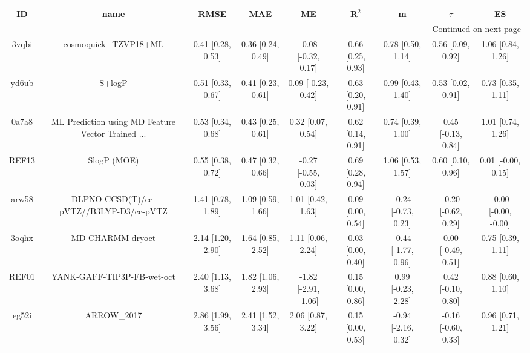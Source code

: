 \documentclass{article}
\begin{document}
\begin{center}
\scriptsize
\begin{longtable}{|ccccccccc|}
\toprule
    ID &                                               name &               RMSE &                MAE &                    ME &              R$^2$ &                    m &               $\tau$ &                    ES \\
\midrule
\endhead
\midrule
\multicolumn{9}{r}{{Continued on next page}} \\
\midrule
\endfoot

\bottomrule
\endlastfoot
 3vqbi &                              cosmoquick\_TZVP18+ML &  0.41 [0.28, 0.53] &  0.36 [0.24, 0.49] &   -0.08 [-0.32, 0.17] &  0.66 [0.25, 0.93] &    0.78 [0.50, 1.14] &    0.56 [0.09, 0.92] &     1.06 [0.84, 1.26] \\
 yd6ub &                                             S+logP &  0.51 [0.33, 0.67] &  0.41 [0.23, 0.61] &    0.09 [-0.23, 0.42] &  0.63 [0.20, 0.91] &    0.99 [0.43, 1.40] &    0.53 [0.02, 0.91] &     0.73 [0.35, 1.11] \\
 0a7a8 &  ML Prediction using MD Feature Vector Trained ... &  0.53 [0.34, 0.68] &  0.43 [0.25, 0.61] &     0.32 [0.07, 0.54] &  0.62 [0.14, 0.91] &    0.74 [0.39, 1.00] &   0.45 [-0.13, 0.84] &     1.01 [0.74, 1.26] \\
 REF13 &                                        SlogP (MOE) &  0.55 [0.38, 0.72] &  0.47 [0.32, 0.66] &   -0.27 [-0.55, 0.03] &  0.69 [0.28, 0.94] &    1.06 [0.53, 1.57] &    0.60 [0.10, 0.96] &    0.01 [-0.00, 0.15] \\
 arw58 &            DLPNO-CCSD(T)/cc-pVTZ//B3LYP-D3/cc-pVTZ &  1.41 [0.78, 1.89] &  1.09 [0.59, 1.66] &     1.01 [0.42, 1.63] &  0.09 [0.00, 0.54] &  -0.24 [-0.73, 0.23] &  -0.20 [-0.62, 0.29] &  -0.00 [-0.00, -0.00] \\
 3oqhx &                                   MD-CHARMM-dryoct &  2.14 [1.20, 2.90] &  1.64 [0.85, 2.52] &     1.11 [0.06, 2.24] &  0.03 [0.00, 0.40] &  -0.44 [-1.77, 0.96] &   0.00 [-0.49, 0.51] &     0.75 [0.39, 1.11] \\
 REF01 &                         YANK-GAFF-TIP3P-FB-wet-oct &  2.40 [1.13, 3.68] &  1.82 [1.06, 2.93] &  -1.82 [-2.91, -1.06] &  0.15 [0.00, 0.86] &   0.99 [-0.23, 2.28] &   0.42 [-0.10, 0.80] &     0.88 [0.60, 1.10] \\
 eg52i &                                        ARROW\_2017 &  2.86 [1.99, 3.56] &  2.41 [1.52, 3.34] &     2.06 [0.87, 3.22] &  0.15 [0.00, 0.53] &  -0.94 [-2.16, 0.32] &  -0.16 [-0.60, 0.33] &     0.96 [0.71, 1.21] \\
\end{longtable}
\end{center}
\end{document}

